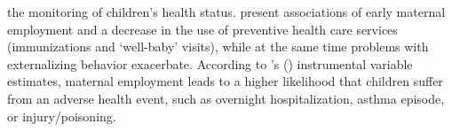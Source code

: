 the monitoring of children's health status. \cite{berger2005earlymaternal} present associations of early maternal employment and a decrease in the use of preventive health care services (immunizations and `well-baby' visits), while at the same time problems with externalizing behavior exacerbate. According to \citeauthor{morrill2011}'s (\citeyear{morrill2011}) instrumental variable estimates, maternal employment leads to a higher likelihood that children suffer from an adverse health event, such as overnight hospitalization, asthma episode, or injury/poisoning.













